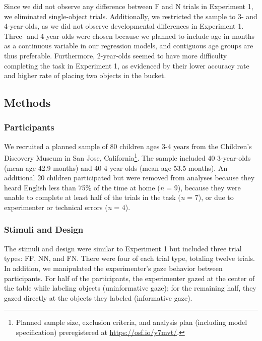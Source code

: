 \documentclass[english,man]{apa6}
\theoremstyle{definition}
\theoremstyle{definition}
\theoremstyle{definition}
\theoremstyle{remark}
\begin{document}
Since we did not observe any difference between F and N trials in
Experiment 1, we eliminated single-object trials. Additionally, we
restricted the sample to 3- and 4-year-olds, as we did not observe
developmental differences in Experiment 1. Three- and 4-year-olds were
chosen because we planned to include age in months as a continuous
variable in our regression models, and contiguous age groups are thus
preferable. Furthermore, 2-year-olds seemed to have more difficulty
completing the task in Experiment 1, as evidenced by their lower
accuracy rate and higher rate of placing two objects in the bucket.

\subsection{Methods}\label{methods-1}

\subsubsection{Participants}\label{participants-1}

We recruited a planned sample of 80 children ages 3-4 years from the
Children's Discovery Museum in San Jose, California\footnote{Planned
  sample size, exclusion criteria, and analysis plan (including model
  specification) preregistered at \url{https://osf.io/y7mvt/}.}. The
sample included 40 3-year-olds (mean age 42.9 months) and 40 4-year-olds
(mean age 53.5 months). An additional 20 children participated but were
removed from analyses because they heard English less than 75\% of the
time at home (\emph{n} = 9), because they were unable to complete at
least half of the trials in the task (\emph{n} = 7), or due to
experimenter or technical errors (\emph{n} = 4).

\subsubsection{Stimuli and Design}\label{stimuli-and-design-1}

The stimuli and design were similar to Experiment 1 but included three
trial types: FF, NN, and FN. There were four of each trial type,
totaling twelve trials. In addition, we manipulated the experimenter's
gaze behavior between participants. For half of the participants, the
experimenter gazed at the center of the table while labeling objects
(uninformative gaze); for the remaining half, they gazed directly at the
objects they labeled (informative gaze).
\end{document}
